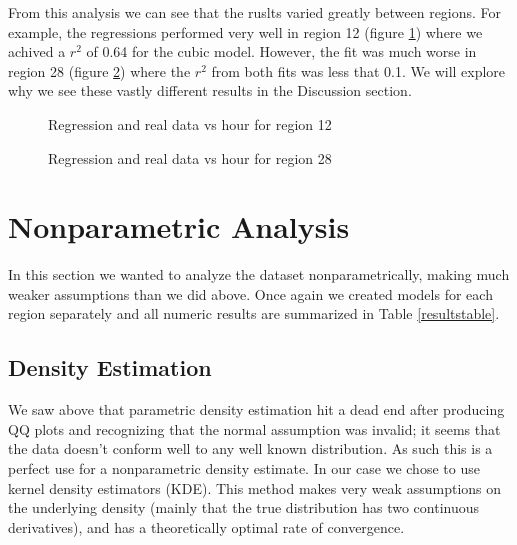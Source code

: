 \documentclass[12pt]{article}
\begin{document}
From this analysis we can see that the ruslts varied greatly between regions. For example, the regressions performed very well in region 12 (figure \ref{region12parametricregression}) where we achived a $r^2$ of 0.64 for the cubic model. However, the fit was much worse in region 28  (figure \ref{region28parametricregression}) where the $r^2$ from both fits was less that 0.1. We will explore why we see these vastly different results in the Discussion section.
\begin{figure}[!ht]
\centering
{} 
\caption{Regression and real data vs hour for region 12}
\label{region12parametricregression}
\end{figure}
\begin{figure}[!ht]
\centering
{} 
\caption{Regression and real data vs hour for region 28}
\label{region28parametricregression}
\end{figure}
\section{Nonparametric Analysis}
In this section we wanted to analyze the dataset nonparametrically, making much weaker assumptions than we did above. Once again we created models for each region separately and all numeric results are summarized in Table \ref{resultstable}.
\subsection{Density Estimation}
We saw above that parametric density estimation hit a dead end after producing QQ plots and recognizing that the normal assumption was invalid; it seems that the data doesn't conform well to any well known distribution. As such this is a perfect use for a nonparametric density estimate. In our case we chose to use kernel density estimators (KDE). This method makes very weak assumptions on the underlying density (mainly that the true distribution has two continuous derivatives), and has a theoretically optimal rate of convergence. 
\end{document}
